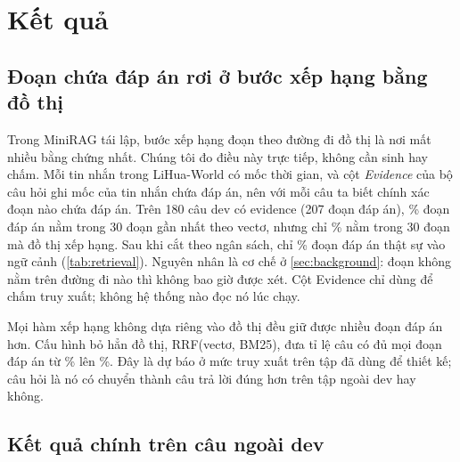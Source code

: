 \section{Kết quả}\label{sec:results}

\subsection{Đoạn chứa đáp án rơi ở bước xếp hạng bằng đồ thị}\label{sec:diagnosis}
Trong MiniRAG tái lập, bước xếp hạng đoạn theo đường đi đồ thị là nơi mất nhiều bằng chứng nhất.
Chúng tôi đo điều này trực tiếp, không cần sinh hay chấm.
Mỗi tin nhắn trong LiHua-World có mốc thời gian, và cột \emph{Evidence} của bộ câu hỏi ghi mốc của tin nhắn chứa đáp án, nên với mỗi câu ta biết chính xác đoạn nào chứa đáp án.
Trên 180 câu dev có evidence (207 đoạn đáp án), \retVecTopThirty\% đoạn đáp án nằm trong 30 đoạn gần nhất theo vectơ, nhưng chỉ \retGraphTopThirty\% nằm trong 30 đoạn mà đồ thị xếp hạng.
Sau khi cắt theo ngân sách, chỉ \retChunkBase\% đoạn đáp án thật sự vào ngữ cảnh (\cref{tab:retrieval}).
Nguyên nhân là cơ chế ở \cref{sec:background}: đoạn không nằm trên đường đi nào thì không bao giờ được xét.
Cột Evidence chỉ dùng để chấm truy xuất; không hệ thống nào đọc nó lúc chạy.

\begin{table}[t]\centering
\caption{Tỉ lệ đoạn chứa đáp án còn lại trong ngữ cảnh sau khi cắt ở $\budget=4000$ token. 180 câu dev có evidence, mô phỏng tất định trên xếp hạng đã lưu (không sinh, không chấm). Tập dev đã dùng để thiết kế các biến thể, nên bảng này là chẩn đoán, không phải kết quả xác nhận.}
\label{tab:retrieval}
\small

\end{table}

Mọi hàm xếp hạng không dựa riêng vào đồ thị đều giữ được nhiều đoạn đáp án hơn.
Cấu hình bỏ hẳn đồ thị, RRF(vectơ, BM25), đưa tỉ lệ câu có đủ mọi đoạn đáp án từ \retFullBase\% lên \retFullVK\%.
Đây là dự báo ở mức truy xuất trên tập đã dùng để thiết kế; câu hỏi là nó có chuyển thành câu trả lời đúng hơn trên tập ngoài dev hay không.

\subsection{Kết quả chính trên \nHeld{} câu ngoài dev}\label{sec:main-results}

\begin{table}[t]\centering
\caption{Kết quả hỏi đáp trên \nHeld{} câu ngoài dev của LiHua-World. Mô hình sinh Qwen2.5-3B, giám khảo \texttt{gemini-flash-lite-latest} (lượt chấm 1), ngân sách 4.000 token. acc/err/neither là trung bình qua các lượt sinh; $\pm$ là độ lệch chuẩn giữa các lượt sinh. Cột Single/Multi/Null là acc của từng nhóm, số trong ngoặc là số câu. Dòng in nghiêng lấy từ bài gốc với giám khảo và đồ thị khác: chỉ để tham chiếu, không so trực tiếp.}
\label{tab:main}
\small
\resizebox{\linewidth}{!}{}
\end{table}

